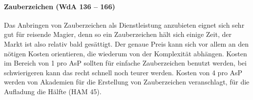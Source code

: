 \paragraph{Zauberzeichen (WdA 136 -- 166)}
Das Anbringen von Zauberzeichen als Dienstleistung anzubieten eignet sich sehr gut für reisende Magier, denn so ein Zauberzeichen hält sich einige Zeit, der Markt ist also relativ bald gesättigt. Der genaue Preis kann sich vor allem an den nötigen Kosten orientieren, die wiederum von der Komplexität abhängen. Kosten im Bereich von \SI{1}{\D} pro AsP sollten für einfache Zauberzeichen benutzt werden, bei schwierigeren kann das recht schnell noch teurer werden. Kosten von \SI{4}{\D} pro AsP werden von Akademien für die Erstellung von Zauberzeichen veranschlagt, für die Aufladung die Hälfte (HAM 45).
